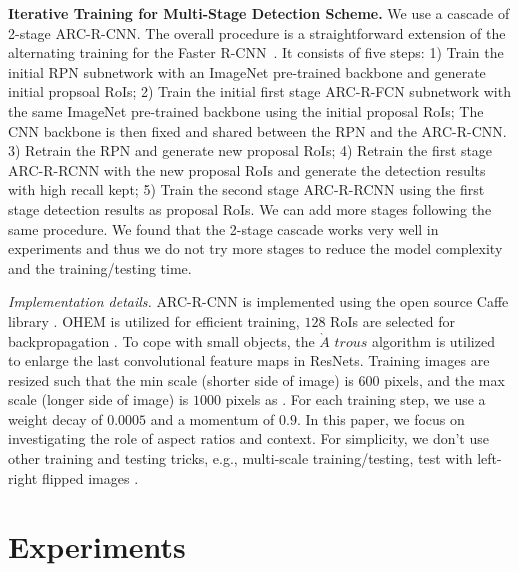 \documentclass[10pt,twocolumn,letterpaper]{article}
\begin{document}
\textbf{Iterative Training for Multi-Stage Detection Scheme.} 
We use a cascade of 2-stage ARC-R-CNN. The overall procedure is a straightforward extension of the alternating training for the Faster R-CNN~\cite{faster_rcnn}. It consists of five steps:  
 1) Train the initial RPN subnetwork with an ImageNet pre-trained backbone and generate initial propsoal RoIs; 2) Train the initial first stage ARC-R-FCN subnetwork with the same ImageNet pre-trained backbone using the initial proposal RoIs; The CNN backbone is then fixed and shared between the RPN and the  ARC-R-CNN. 3) Retrain the RPN and generate new proposal RoIs; 4) Retrain the first stage ARC-R-RCNN with the new proposal RoIs and generate the detection results with high recall kept; 5) Train the second stage ARC-R-RCNN using the first stage detection results as proposal RoIs. We can add more stages following the same procedure. We found that the 2-stage cascade works very well in experiments and thus we do not try more stages to reduce the model complexity and the training/testing time. 


\textit{Implementation details.} ARC-R-CNN is implemented using the open source Caffe library \cite{caffe}. OHEM \cite{ohem} is utilized for efficient training, $128$ RoIs are selected for backpropagation \cite{rfcn}. To cope with small objects, the $\grave{A}$ $trous$ algorithm \cite{hole, mallat} is utilized to enlarge the last convolutional feature maps in ResNets.
Training images are resized such that the min scale (shorter side of image) is $600$ pixels, and the max scale (longer side of image) is $1000$ pixels as \cite{fast_rcnn}.  
For each training step, we use a weight decay of $0.0005$ and a momentum of $0.9$. 
In this paper, we focus on investigating the role of aspect ratios and context.
For simplicity, we don't use other training and testing tricks, e.g., multi-scale training/testing, test with left-right flipped images \cite{ion}.

\vspace{-2mm}
\section{Experiments}
\vspace{-1mm}
\end{document}
